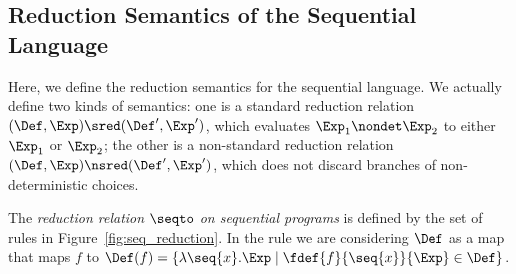 \subsection{Reduction Semantics of the Sequential Language}
Here, we define the reduction semantics for the sequential language.
We actually define two kinds of semantics:
one is a standard reduction relation
\((\Def,\Exp)\sred (\Def',\Exp')\), which evaluates \( \Exp_1 \nondet \Exp_2\) to either \( \Exp_1 \) or \( \Exp_2\); the other is a non-standard reduction relation
\((\Def,\Exp)\nsred(\Def',\Exp')\), which
 does not discard branches of non-deterministic choices.

\begin{definition}
  The \emph{reduction relation $\seqto$ on %
    sequential programs} is defined by the set of rules in Figure~\ref{fig:seq_reduction}.
    In the rule  we are considering \(\Def\) as a map that maps \( f \) to \( \Def(f) =  \{ \lambda \seq{x}. \Exp \mid \fdef{f}{\seq{x}}{\Exp} \in \Def \}\).
\end{definition}
